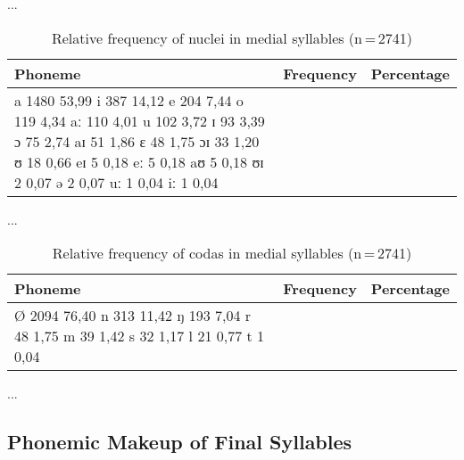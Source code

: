 ...

\begin{table}[hp]\centering
\caption[Relative frequency of nuclei in medial syllables]{Relative frequency of nuclei in medial syllables (n\,=\,2741)}
\begin{tabu} to 0.5\textwidth{X X[c] X[c]}
\tableheaderfont\toprule
Phoneme
	& Frequency
	& Percentage
	\\
	
\toprule

a	1480	53,99%
i	387	14,12%
e	204	7,44%
o	119	4,34%
aː	110	4,01%
u	102	3,72%
ɪ	93	3,39%
ɔ	75	2,74%
aɪ	51	1,86%
ɛ	48	1,75%
ɔɪ	33	1,20%
ʊ	18	0,66%
eɪ	5	0,18%
eː	5	0,18%
aʊ	5	0,18%
ʊɪ	2	0,07%
ə	2	0,07%
uː	1	0,04%
iː	1	0,04%

\bottomrule
\end{tabu}
\label{tab:midnuc}
\end{table}

...

\begin{table}[hp]\centering
\caption[Relative frequency of codas in medial syllables]{Relative frequency of codas in medial syllables (n\,=\,2741)}
\begin{tabu} to 0.5\textwidth{X X[c] X[c]}
\tableheaderfont\toprule
Phoneme
	& Frequency
	& Percentage
	\\
	
\toprule

Ø	2094	76,40%
n	313	11,42%
ŋ	193	7,04%
r	48	1,75%
m	39	1,42%
s	32	1,17%
l	21	0,77%
t	1	0,04%

\bottomrule
\end{tabu}
\label{tab:midcod}
\end{table}

...

\subsection{Phonemic Makeup of Final Syllables}

